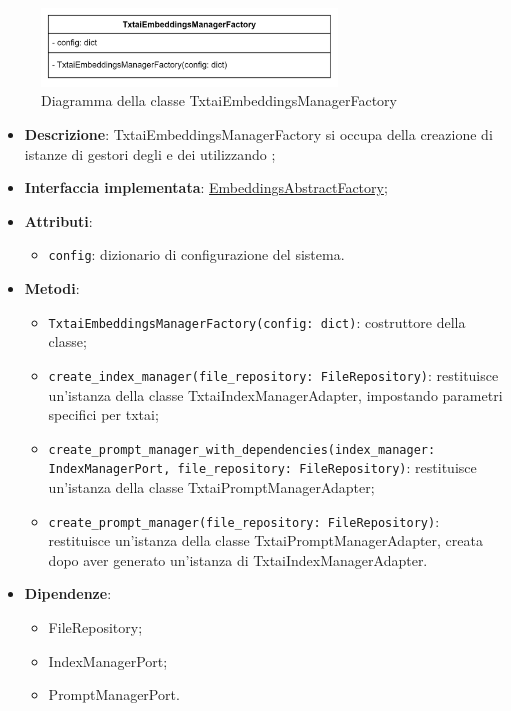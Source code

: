  \label{TxtaiEmbeddingsManagerFactory}
\begin{figure}[H]
    \centering
    \includegraphics[width=0.7\textwidth]{assets/Backend/txtai_embeddings_manager_factory.png}
    \caption{Diagramma della classe TxtaiEmbeddingsManagerFactory}
  \end{figure}
\begin{itemize}
    \item \textbf{Descrizione}: TxtaiEmbeddingsManagerFactory si occupa della creazione di istanze di gestori degli  e dei  utilizzando ;
    \item \textbf{Interfaccia implementata}: \hyperref[EmbeddingsAbstractFactory]{EmbeddingsAbstractFactory};
    \item \textbf{Attributi}:
    \begin{itemize}
        \item \texttt{config}: dizionario di configurazione del sistema.
    \end{itemize}
    \item \textbf{Metodi}:
    \begin{itemize}
        \item \texttt{TxtaiEmbeddingsManagerFactory(config: dict)}: costruttore della classe;
        \item \texttt{create\_index\_manager(file\_repository: FileRepository)}: restituisce un'istanza della classe TxtaiIndexManagerAdapter, impostando parametri specifici per txtai;
        \item \texttt{create\_prompt\_manager\_with\_dependencies(index\_manager: IndexManagerPort, file\_repository: FileRepository)}: restituisce un'istanza della classe TxtaiPromptManagerAdapter;
        \item \texttt{create\_prompt\_manager(file\_repository: FileRepository)}: restituisce un'istanza della classe TxtaiPromptManagerAdapter, creata dopo aver generato un'istanza di TxtaiIndexManagerAdapter.
    \end{itemize}
    \item \textbf{Dipendenze}:
    \begin{itemize}
        \item FileRepository;
        \item IndexManagerPort;
        \item PromptManagerPort.
    \end{itemize}
\end{itemize} 

